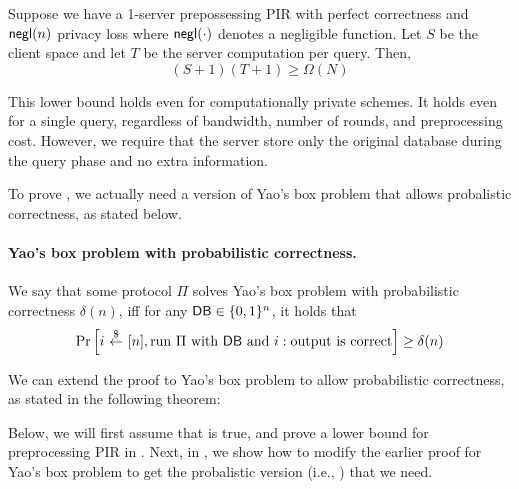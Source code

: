 \begin{theorem}
    Suppose we have a 1-server prepossessing PIR with perfect correctness and 
${\sf negl}(n)$ privacy loss 
where ${\sf negl}(\cdot)$ denotes a negligible function. 
Let $S$ be the client space and let $T$ be the server computation 
per query.
Then,
    \[(S+1)(T+1) \ge  \Omega(N) \]
\label{thm:pir-st}
\end{theorem}
This lower bound holds even for computationally private schemes. It holds even for a single query, regardless of bandwidth, 
number of rounds, 
and preprocessing cost. 
However, we require that the server 
store 
only the original database during the query phase
and no extra information.


To prove , 
we actually need a 
version of Yao's box problem that allows probalistic 
correctness, as stated below. 

\paragraph{Yao's box problem with probabilistic correctness.}
We say that some protocol $\Pi$ solves
Yao's box problem with probabilistic correctness $\delta(n)$,  
iff 
for any ${\sf DB}\in \{0, 1\}^n$, 
it holds that 
\[
\Pr\left[
i ~{\overset{\$}{\leftarrow}}~ [n], \text{run $\Pi$ with ${\sf DB}$ and $i$} : 
\text{output is correct} 
\right] \geq \delta(n) 
\]

We can extend the proof to Yao's box problem
to allow probabilistic correctness, as stated
in the following theorem:

\begin{theorem}
\label{thm:yao-prob}
\end{theorem}

Below, we will first assume
that  
is true, and prove a lower bound for preprocessing PIR 
in .
Next, in , 
we show how to modify the earlier proof for Yao's box problem
to get the probalistic version 
(i.e., ) 
that we need.


